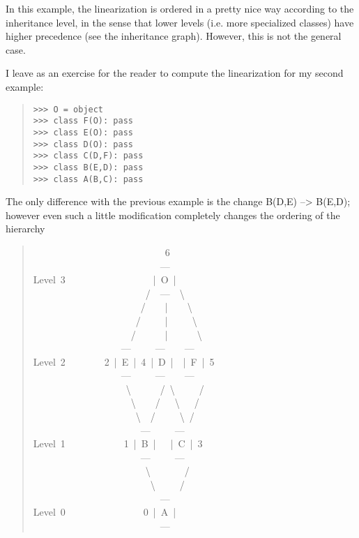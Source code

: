 \documentclass[10pt,english]{article}
\begin{document}
In this example, the linearization is ordered in a pretty nice way
according to the inheritance level, in the sense that lower levels (i.e.
more specialized classes) have higher precedence (see the inheritance
graph).  However, this is not the general case.

I leave as an exercise for the reader to compute the linearization for
my second example:
\begin{quote}
\begin{verbatim}>>> O = object
>>> class F(O): pass
>>> class E(O): pass
>>> class D(O): pass
>>> class C(D,F): pass
>>> class B(E,D): pass
>>> class A(B,C): pass\end{verbatim}
\end{quote}

The only difference with the previous example is the change B(D,E) --{\textgreater}
B(E,D); however even such a little modification completely changes the
ordering of the hierarchy
\begin{quote}
\begin{ttfamily}\begin{flushleft}
\mbox{~~~~~~~~~~~~~~~~~~~~~~~~~~~6}\\
\mbox{~~~~~~~~~~~~~~~~~~~~~~~~~~---}\\
\mbox{Level~3~~~~~~~~~~~~~~~~~~|~O~|}\\
\mbox{~~~~~~~~~~~~~~~~~~~~~~~/~~---~~{\textbackslash}}\\
\mbox{~~~~~~~~~~~~~~~~~~~~~~/~~~~|~~~~{\textbackslash}}\\
\mbox{~~~~~~~~~~~~~~~~~~~~~/~~~~~|~~~~~{\textbackslash}}\\
\mbox{~~~~~~~~~~~~~~~~~~~~/~~~~~~|~~~~~~{\textbackslash}}\\
\mbox{~~~~~~~~~~~~~~~~~~---~~~~~---~~~~---}\\
\mbox{Level~2~~~~~~~~2~|~E~|~4~|~D~|~~|~F~|~5}\\
\mbox{~~~~~~~~~~~~~~~~~~---~~~~~---~~~~---}\\
\mbox{~~~~~~~~~~~~~~~~~~~{\textbackslash}~~~~~~/~{\textbackslash}~~~~~/}\\
\mbox{~~~~~~~~~~~~~~~~~~~~{\textbackslash}~~~~/~~~{\textbackslash}~~~/}\\
\mbox{~~~~~~~~~~~~~~~~~~~~~{\textbackslash}~~/~~~~~{\textbackslash}~/}\\
\mbox{~~~~~~~~~~~~~~~~~~~~~~---~~~~~---}\\
\mbox{Level~1~~~~~~~~~~~~1~|~B~|~~~|~C~|~3}\\
\mbox{~~~~~~~~~~~~~~~~~~~~~~---~~~~~---}\\
\mbox{~~~~~~~~~~~~~~~~~~~~~~~{\textbackslash}~~~~~~~/}\\
\mbox{~~~~~~~~~~~~~~~~~~~~~~~~{\textbackslash}~~~~~/}\\
\mbox{~~~~~~~~~~~~~~~~~~~~~~~~~~---}\\
\mbox{Level~0~~~~~~~~~~~~~~~~0~|~A~|}\\
\mbox{~~~~~~~~~~~~~~~~~~~~~~~~~~---}
\end{flushleft}\end{ttfamily}
\end{quote}
\end{document}
